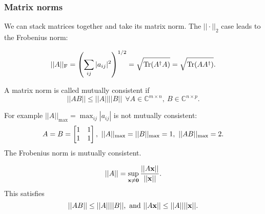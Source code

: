 \documentclass{article}
\begin{document}
\subsubsection{Matrix norms}
We can stack matrices together and take its matrix norm. The $||\cdot||_2$ case leads to the Frobenius norm:
\begin{definition}
    \begin{equation}
        ||A||_{\mathrm{F}}=\left( \sum_{ij}|a_{ij}|^2 \right)^{1/2}=\sqrt{\operatorname{Tr}(A^{\dagger} A)}=\sqrt{\operatorname{Tr}(A A^{\dagger})}.
    \end{equation}
\end{definition}

\begin{definition}
    A matrix norm is called mutually consistent if
    \begin{equation}
        ||AB||\leq ||A||||B||\ \ \forall A \in \mathbb{C}^{m\times n},\ B\in\mathbb{C}^{n\times p}.
    \end{equation}
\end{definition}
For example $||A||_{\mathrm{max}}=\max_{ij}|a_{ij}|$ is not mutually consistent:
\begin{equation}
    A=B=\ttmat{1}{1}{1}{1},\ ||A||_{\mathrm{max}}=||B||_{\mathrm{max}}=1,\ ||AB||_{\mathrm{max}}=2.
\end{equation}
The Frobenius norm is mutually consistent.
\begin{definition}
    \begin{equation}
        ||A||=\sup_{\bm{\mathrm{x}}\neq\bm{\mathrm{0}}}\frac{||A\bm{\mathrm{x}}||}{||\bm{\mathrm{x}}||}.
    \end{equation}
    This satisfies 
    \begin{equation}
        ||AB||\leq||A||||B||,\ \text{and}\ ||A\bvec{x}||\leq||A||||\bvec{x}||.
    \end{equation}
\end{definition}
\end{document}
